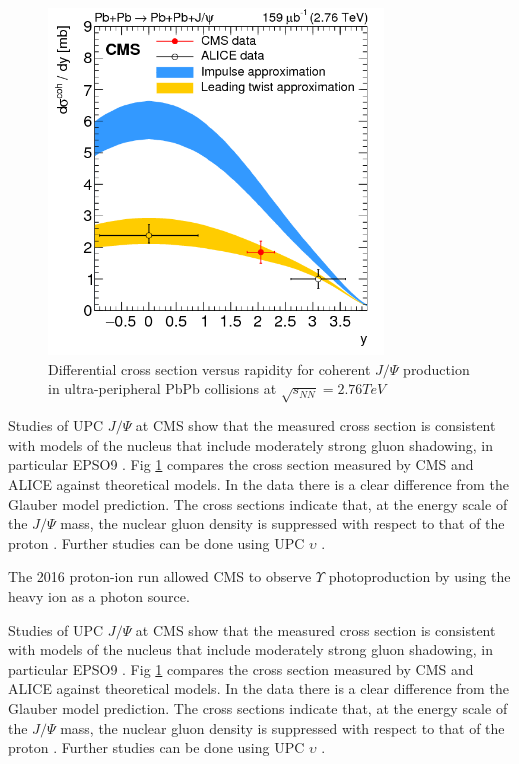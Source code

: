 \begin{figure}[h!]
\begin{centering}
\includegraphics[width=3.5in]{Chapter2/importfigs/patkenny_Figure_002.png}
\par\end{centering}
\caption{Differential cross section versus rapidity for coherent $J/\Psi$ production in ultra-peripheral PbPb collisions at $\sqrt{s_{NN}}=2.76 TeV$ \cite{Khachatryan:2016qhq} \label{fig:pk3}}
\end{figure}

Studies of UPC $J/\Psi$ at CMS show that the measured cross section is consistent with models of the nucleus that include moderately strong gluon shadowing, in particular EPSO9 \cite{lta2013.05}\cite{Eskola:2009uj}. Fig \ref{fig:pk3} compares the cross section measured by CMS and ALICE against theoretical models. In the data there is a clear difference from the Glauber model prediction. The cross sections indicate that, at the energy scale of the $J/\Psi$ mass, the nuclear gluon density is suppressed with respect to that of the proton \cite{Frankfurt:2011cs}. Further studies can be done using UPC $\upsilon$ \cite{pQCD2013.02}\cite{Cisek:2012yt}. 

The 2016 proton-ion run allowed CMS to observe $\Upsilon$ photoproduction by using the heavy ion as a photon source. 

Studies of UPC $J/\Psi$ at CMS show that the measured cross section is consistent with models of the nucleus that include moderately strong gluon shadowing, in particular EPSO9 \cite{lta2013.05}\cite{Eskola:2009uj}. Fig \ref{fig:pk3} compares the cross section measured by CMS and ALICE against theoretical models. In the data there is a clear difference from the Glauber model prediction. The cross sections indicate that, at the energy scale of the $J/\Psi$ mass, the nuclear gluon density is suppressed with respect to that of the proton \cite{Frankfurt:2011cs}. Further studies can be done using UPC $\upsilon$ \cite{pQCD2013.02}\cite{Cisek:2012yt}.
 

